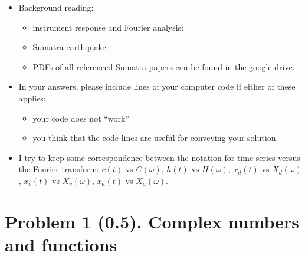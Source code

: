 \documentclass[11pt,titlepage,fleqn]{article}
\newcommand{\fft}{h}
\newcommand{\ffw}{H}
\begin{document}
\begin{itemize}
\item Background reading:

\begin{itemize}
\item instrument response and Fourier analysis: \citet[][Ch.~6]{SteinWysession}
\item Sumatra earthquake: \citep{Lay2005,Ammon2005,Park2005,Ni2005}
\item PDFs of all referenced Sumatra papers can be found in the google drive.
\end{itemize}

\item In your answers, please include lines of your computer code if either of these applies:
%
\begin{itemize}
\item your code does not ``work''
\item you think that the code lines are useful for conveying your solution
\end{itemize}

\item I try to keep some correspondence between the notation for time series versus the Fourier transform: $c(t)$ vs $C(\omega)$, $\fft(t)$ vs $\ffw(\omega)$, $x_d(t)$ vs $X_d(\omega)$, $x_v(t)$ vs $X_v(\omega)$, $x_a(t)$ vs $X_a(\omega)$.

\end{itemize}


\section*{Problem 1 (0.5). Complex numbers and functions}
\end{document}
